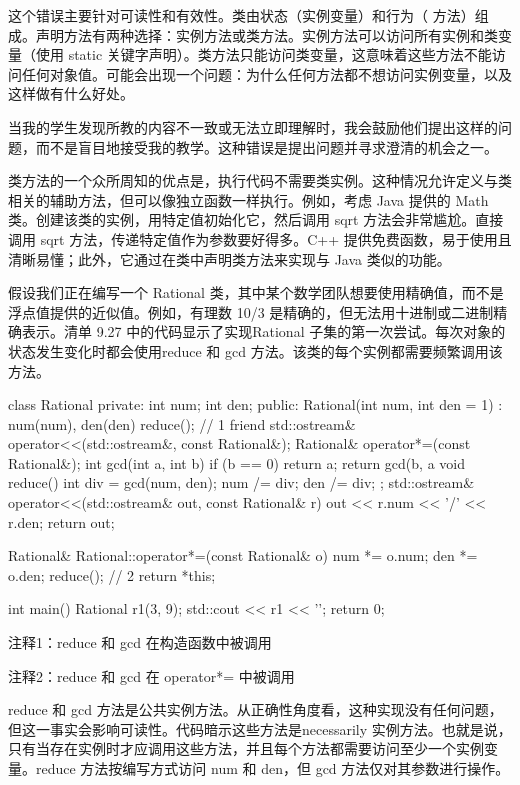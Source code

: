这个错误主要针对可读性和有效性。类由状态（实例变量）和行为（ 方法）组成。声明方法有两种选择：实例方法或类方法。实例方法可以访问所有实例和类变量（使用 static 关键字声明）。类方法只能访问类变量，这意味着这些方法不能访问任何对象值。可能会出现一个问题：为什么任何方法都不想访问实例变量，以及这样做有什么好处。

当我的学生发现所教的内容不一致或无法立即理解时，我会鼓励他们提出这样的问题，而不是盲目地接受我的教学。这种错误是提出问题并寻求澄清的机会之一。

类方法的一个众所周知的优点是，执行代码不需要类实例。这种情况允许定义与类相关的辅助方法，但可以像独立函数一样执行。例如，考虑 Java 提供的 Math 类。创建该类的实例，用特定值初始化它，然后调用 sqrt 方法会非常尴尬。直接调用 sqrt 方法，传递特定值作为参数要好得多。C++ 提供免费函数，易于使用且清晰易懂；此外，它通过在类中声明类方法来实现与 Java 类似的功能。


假设我们正在编写一个 Rational 类，其中某个数学团队想要使用精确值，而不是浮点值提供的近似值。例如，有理数 10/3 是精确的，但无法用十进制或二进制精确表示。清单 9.27 中的代码显示了实现Rational 子集的第一次尝试。每次对象的状态发生变化时都会使用reduce 和 gcd 方法。该类的每个实例都需要频繁调用该方法。


\begin{cpp}
class Rational {
private:
  int num;
  int den;
public:
  Rational(int num, int den = 1) : num(num), den(den)
    { reduce(); } // 1
  friend std::ostream& operator<<(std::ostream&, const Rational&);
  Rational& operator*=(const Rational&);
  int gcd(int a, int b) {
    if (b == 0)
      return a;
    return gcd(b, a %
  }
  void reduce() {
    int div = gcd(num, den);
    num /= div;
    den /= div;
  }
};
std::ostream& operator<<(std::ostream& out, const Rational& r) {
  out << r.num << '/' << r.den;
  return out;
}

Rational& Rational::operator*=(const Rational& o) {
  num *= o.num;
  den *= o.den;
  reduce(); // 2
  return *this;
}

int main() {
  Rational r1(3, 9);
  std::cout << r1 << '\n';
  return 0;
}
\end{cpp}

{\footnotesize
注释1：reduce 和 gcd 在构造函数中被调用

注释2：reduce 和 gcd 在 operator*= 中被调用
}


reduce 和 gcd 方法是公共实例方法。从正确性角度看，这种实现没有任何问题，但这一事实会影响可读性。代码暗示这些方法是necessarily 实例方法。也就是说，只有当存在实例时才应调用这些方法，并且每个方法都需要访问至少一个实例变量。reduce 方法按编写方式访问 num 和 den，但 gcd 方法仅对其参数进行操作。

